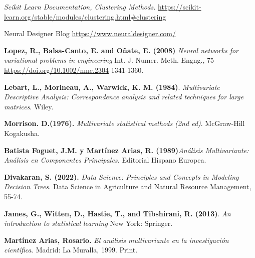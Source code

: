 \begin{thebibliography}{99}
 \textit{Scikit Learn Documentation, Clustering Methods. } \url{https://scikit-learn.org/stable/modules/clustering.html#clustering}


 Neural Designer Blog \url{https://www.neuraldesigner.com/}
          
 \textbf{Lopez, R., Balsa-Canto, E. and Oñate, E. (2008)} \textit{ Neural networks for variational problems in engineering} Int. J. Numer. Meth. Engng., 75\\ \url{https://doi.org/10.1002/nme.2304} 1341-1360. 


\textbf{Lebart, L., Morineau, A.,  Warwick, K. M. (1984)}.\textit{ Multivariate Descriptive Analysis: Correspondence analysis and related techniques for large matrices}. Wiley.

\textbf{Morrison. D.(1976).}\textit{ Multivariate statistical methods (2nd ed)}. McGraw-Hill Kogakusha.

\textbf{Batista Foguet, J.M. y Martínez Arias, R. (1989)}\textit{Análisis Multivariante: Análisis en Componentes Principales. } Editorial Hispano Europea.

\textbf{Divakaran, S. (2022). }\textit{Data Science: Principles and Concepts in Modeling Decision Trees.} Data Science in Agriculture and Natural Resource Management, 55-74.

\textbf{James, G., Witten, D., Hastie, T., and Tibshirani, R. (2013)}. \textit{An introduction to statistical learning } New York: Springer.

 \textbf{Martínez Arias, Rosario. }\textit{El análisis multivariante en la investigación científica. }Madrid: La Muralla, 1999. Print.
\end{thebibliography}
 